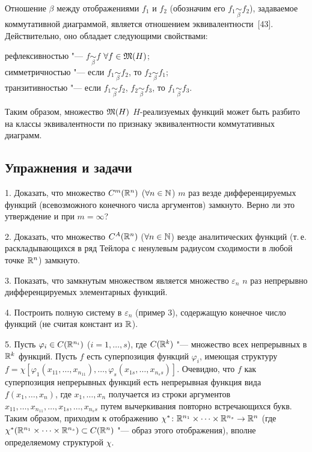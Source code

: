 Отношение $\beta$ между отображениями $f_1$ и $f_2$ (обозначим его
$f_1\underset{\beta}{\sim}f_2$), задаваемое коммутативной диаграммой,
является отношением эквивалентности~[43]. Действительно, оно обладает
следующими свойствами:

\noindent рефлексивностью "--- $f\underset{\beta}{\sim}f$ $\forall f\in\mathfrak M(H)$;\\
симметричностью "--- если $f_1\underset{\beta}{\sim}f_2$, то
$f_2\underset{\beta}{\sim}f_1$;\\
транзитивностью "--- если $f_1\underset{\beta}{\sim}f_2$,
$f_2\underset{\beta}{\sim}f_3$, то $f_1\underset{\beta}{\sim}f_3$.

Таким образом, множество $\mathfrak M(H)$ $H$-реализуемых функций может быть
разбито на классы эквивалентности по признаку эквивалентности
коммутативных диаграмм.

\subsection*{Упражнения и задачи}
1. Доказать, что множество $C^m(\mathbb R^n)$ ($\forall n\in\mathbb N$) $m$ раз везде
дифференцируемых функций (всевозможного
%
конечного числа аргументов) замкнуто. Верно ли это утверждение и при
$m=\infty$?

2. Доказать, что множество $C^A(\mathbb R^n)$ ($\forall n\in\mathbb N$) везде
аналитических функций (т.\,е. раскладывающихся в ряд Тейлора с ненулевым
радиусом сходимости в любой точке $\mathbb R^n$) замкнуто.

3. Показать, что замкнутым множеством является множество $\varepsilon_n$
$n$ раз непрерывно дифференцируемых элементарных функций.

4. Построить полную систему в $\varepsilon_n$ (пример
3), содержащую конечное число функций (не считая
констант из $\mathbb R$).

5. Пусть $\varphi_i\in C(\mathbb R^{n_i})$ ($i=1,\dots,s$), где $C(\mathbb R^k)$ "---
множество всех непрерывных в $\mathbb R^k$ функций. Пусть $f$ есть суперпозиция
функций $\varphi_i$, имеющая структуру
$f=\chi[\varphi_1(x_{11},\dots,x_{n_11}),\dots,\varphi_s(x_{1s},\dots,x_{n_ss})]$.
Очевидно, что $f$ как суперпозиция непрерывных функций есть непрерывная
функция вида $f(x_1,\dots,x_n)$, где $x_1,\dots,x_n$ получается из строки
аргументов $x_{11},\dots,x_{n_11},\dots,x_{1s},\dots,x_{n_ss}$ путем
вычеркивания повторно встречающихся букв. Таким образом, приходим
к отображению $\chi^*\colon\mathbb R^{n_1}\times\dots\times\mathbb R^{n_s}\to\mathbb R^n$ (где
$\chi^*(\mathbb R^{n_1}\times\dots\times\mathbb R^{n_s})\subset C(\mathbb R^n)$ "--- образ этого
отображения), вполне определяемому структурой
$\chi$.

